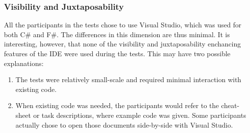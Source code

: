 \subsubsection{Visibility and Juxtaposability}
All the participants in the tests chose to use Visual Studio, which was used for both C\# and F\#. The differences in this dimension are thus minimal. It is interesting, however, that none of the visibility and juxtaposability enchancing features of the \gls{IDE} were used during the tests. This may have two possible explanations:
\begin{enumerate}
    \item The tests were relatively small-scale and required minimal interaction with existing code.
    \item When existing code was needed, the participants would refer to the cheat-sheet or task descriptions, where example code was given. Some participants actually chose to open those documents side-by-side with Visual Studio.
\end{enumerate}